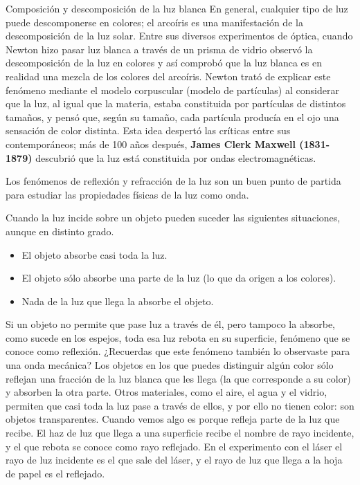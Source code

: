 \begin{sectionbox}{Composición y descomposición de la luz blanca}
    En general, cualquier tipo de luz puede descomponerse en colores;
           el arcoíris es una manifestación de la descomposición de la luz solar. Entre sus diversos experimentos de óptica, cuando Newton hizo pasar luz blanca a través de un prisma de vidrio observó la descomposición de la luz en colores y así comprobó que la
           luz blanca es en realidad una mezcla de los colores del arcoíris. Newton trató de explicar este fenómeno mediante el modelo corpuscular (modelo de partículas) al considerar que la luz, al igual que la materia, estaba constituida por partículas de distintos
           tamaños, y pensó que, según su tamaño, cada partícula producía en el ojo una sensación de color distinta. Esta idea despertó las críticas entre sus contemporáneos; más
           de 100 años después, \textbf{James Clerk Maxwell (1831-1879)} descubrió que la luz está
           constituida por ondas electromagnéticas.
           
           Los fenómenos de reflexión y refracción de la luz son un buen punto de partida para
           estudiar las propiedades físicas de la luz como onda.
   
           Cuando la luz incide sobre un objeto pueden suceder las siguientes situaciones, aunque
           en distinto grado.
   
           \begin{itemize}
               \item El objeto absorbe casi toda la luz.
               \item El objeto sólo absorbe una parte de la luz (lo que da origen a los colores).
               \item Nada de la luz que llega la absorbe el objeto.
           \end{itemize}
   
           Si un objeto no permite que pase luz a través de él, pero tampoco la absorbe, como sucede en los espejos, toda esa luz rebota en su superficie, fenómeno que se conoce
           como reflexión. ¿Recuerdas que este fenómeno también lo observaste para una onda mecánica? Los objetos en los que puedes distinguir algún color sólo reflejan una fracción de
           la luz blanca que les llega (la que corresponde a su color) y absorben la otra parte. Otros materiales, como el aire, el agua y el vidrio, permiten que casi toda la luz pase a través de ellos, y por ello no tienen color:
           son objetos transparentes. Cuando vemos algo es porque refleja
           parte de la luz que recibe. El haz de luz que llega a una
           superficie recibe el nombre de rayo incidente, y el que rebota se conoce como rayo reflejado. En el experimento con
           el láser el rayo de luz incidente es el que sale del láser, y el rayo de luz que llega a la hoja de papel es el reflejado.
   

\end{sectionbox}
